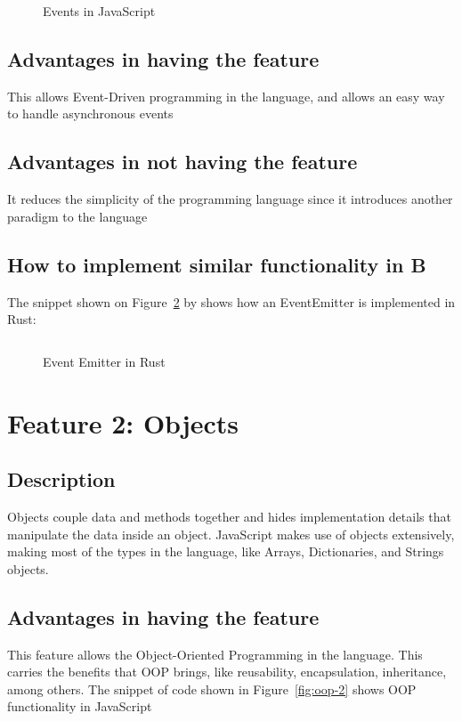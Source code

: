 \documentclass{article}
\newcommand{\js}[1]{\inputminted{javascript}{samples/js/#1.js}}
\begin{document}
  \begin{figure}[ht]
    \js{events}
    \caption{Events in JavaScript}
    \label{fig:events-2}
  \end{figure}

  \subsection{Advantages in having the feature}
  This allows Event-Driven programming in the language, and allows an easy way
  to handle asynchronous events

  \subsection{Advantages in not having the feature}
  It reduces the simplicity of the programming language since it introduces
  another paradigm to the language

  \subsection{How to implement similar functionality in B}
  The snippet shown on Figure~\ref{fig:event-emitter} by \cite{shemsedinov}
  shows how an EventEmitter is implemented in Rust:

  \begin{figure}[H]
    \inputminted[fontsize=\small]{rust}{samples/rust/event-emitter.rs}
    \caption{Event Emitter in Rust}
    \label{fig:event-emitter}
  \end{figure}


  \section{Feature 2: Objects}
  \subsection{Description}
  Objects couple data and methods together and hides implementation details that
  manipulate the data inside an object. JavaScript makes use of objects
  extensively, making most of the types in the language, like Arrays,
  Dictionaries, and Strings objects.

  \subsection{Advantages in having the feature}
  This feature allows the Object-Oriented Programming in the language. This
  carries the benefits that OOP brings, like reusability, encapsulation,
  inheritance, among others. The snippet of code shown in Figure~\ref{fig:oop-2}
  shows OOP functionality in JavaScript
\end{document}
